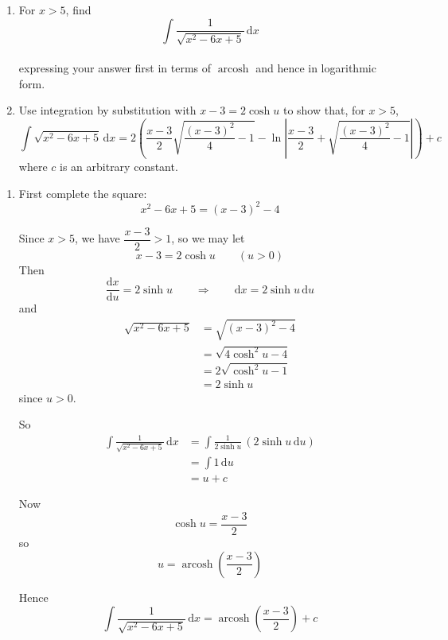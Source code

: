 \documentclass[leqno]{article}
\begin{document}
\begin{enumerate}[
  label=\textbf{\arabic*.},
  leftmargin=*,
  topsep=0pt,
  partopsep=0pt,
  parsep=0pt
]
\begin{enumerate}[label=(\roman*), start=1]
  \item For $x>5$, find
  \[
  \int \frac{1}{\sqrt{x^2-6x+5}}\,\mathrm{d}x
  \] \\
  expressing your answer first in terms of $\operatorname{arcosh}$ and hence in logarithmic form.  \\
  \item Use integration by substitution with $x-3=2\cosh u$ to show that, for $x>5$,
  \[
  \int \sqrt{x^2-6x+5}\,\mathrm{d}x=2\left(\frac{x-3}{2}\sqrt{\frac{(x-3)^2}{4}-1}-\ln\left|\frac{x-3}{2}+\sqrt{\frac{(x-3)^2}{4}-1}\right|\right)+c
  \]
  where $c$ is an arbitrary constant.  \\
\end{enumerate}

\vspace*{30pt}

\begin{tcolorbox}[colback=white, colframe=scarlet, title={\textbf{Solution}}, breakable, grow to left by=6mm, grow to right by=10mm]
\begin{enumerate}[label=\textbf{(\roman*)}, start=1]
  \item First complete the square:
  \[
  x^2-6x+5=(x-3)^2-4
  \]

  Since $x>5$, we have $\dfrac{x-3}{2}>1$, so we may let
  \[
  x-3=2\cosh u \qquad (u>0)
  \]
  Then
  \[
  \frac{\mathrm{d}x}{\mathrm{d}u}=2\sinh u
  \qquad\Rightarrow\qquad
  \mathrm{d}x=2\sinh u\,\mathrm{d}u
  \]
  and
  \begin{align*}
  \sqrt{x^2-6x+5}
  &=\sqrt{(x-3)^2-4} \\
  &=\sqrt{4\cosh^2u-4} \\
  &=2\sqrt{\cosh^2u-1} \\
  &=2\sinh u
  \end{align*}
  since $u>0$.

  So
  \begin{align*}
  \int \frac{1}{\sqrt{x^2-6x+5}}\,\mathrm{d}x
  &=\int \frac{1}{2\sinh u}\,(2\sinh u\,\mathrm{d}u) \\
  &=\int 1\,\mathrm{d}u \\
  &=u+c
  \end{align*}

  Now
  \[
  \cosh u=\frac{x-3}{2}
  \]
  so
  \[
  u=\operatorname{arcosh}\left(\frac{x-3}{2}\right)
  \]

  Hence
  \[
  \int \frac{1}{\sqrt{x^2-6x+5}}\,\mathrm{d}x
  =\operatorname{arcosh}\left(\frac{x-3}{2}\right)+c
  \]


\end{enumerate}
\end{tcolorbox}
\end{enumerate}
\end{document}
